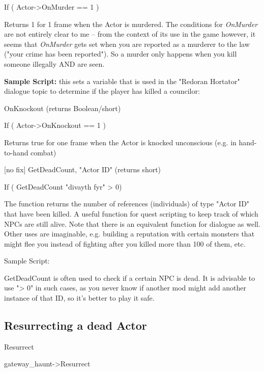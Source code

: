 \documentclass[
]{article}
\begin{document}
If ( Actor-\textgreater OnMurder == 1 )

Returns 1 for 1 frame when the Actor is murdered. The conditions for
\emph{OnMurder} are not entirely clear to me -- from the context of its
use in the game however, it seems that \emph{OnMurder} gets set when you
are reported as a murderer to the law ("your crime has been reported").
So a murder only happens when you kill someone illegally AND are seen.

\textbf{Sample Script:} this sets a variable that is used in the
"Redoran Hortator" dialogue topic to determine if the player has killed
a councilor:



OnKnockout (returns Boolean/short)

If ( Actor-\textgreater OnKnockout == 1 )

Returns true for one frame when the Actor is knocked unconscious (e.g.
in hand-to-hand combat)

{[}no fix{]} GetDeadCount, "Actor ID" (returns short)

If ( GetDeadCount "divayth fyr" \textgreater{} 0)

The function returns the number of references (individuals) of type
"Actor ID" that have been killed. A useful function for quest scripting
to keep track of which NPCs are still alive. Note that there is an
equivalent function for dialogue as well. Other uses are imaginable,
e.g. building a reputation with certain monsters that might flee you
instead of fighting after you killed more than 100 of them, etc.

Sample Script:

GetDeadCount is often used to check if a certain NPC is dead. It is
advisable to use "\textgreater{} 0" in such cases, as you never know if
another mod might add another instance of that ID, so it's better to
play it safe.



\hypertarget{resurrecting-a-dead-actor}{%
\subsection{\texorpdfstring{\hfill\break
Resurrecting a dead
Actor}{ Resurrecting a dead Actor}}\label{resurrecting-a-dead-actor}}

Resurrect

gateway\_haunt-\textgreater Resurrect
\end{document}
